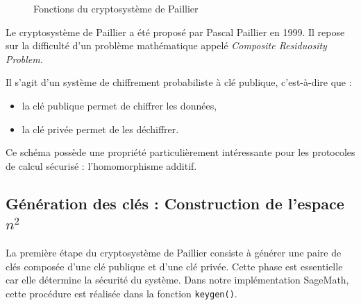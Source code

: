 \documentclass[12pt,a4paper]{report}
\begin{document}
\begin{figure}[h]
    \caption{ Fonctions du cryptosystème de Paillier}
\end{figure}


Le cryptosystème de Paillier a été proposé par Pascal Paillier en 1999.  
Il repose sur la difficulté d’un problème mathématique appelé \textit{Composite Residuosity Problem}.

Il s’agit d’un système de chiffrement probabiliste à clé publique, c’est-à-dire que :
\begin{itemize}
\item la clé publique permet de chiffrer les données,
\item la clé privée permet de les déchiffrer.
\end{itemize}

Ce schéma possède une propriété particulièrement intéressante pour les protocoles de calcul sécurisé : l’homomorphisme additif.



\subsection{Génération des clés : Construction de l'espace $n^2$}


La première étape du cryptosystème de Paillier consiste à générer une paire de
clés composée d'une clé publique et d'une clé privée.  
Cette phase est essentielle car elle détermine la sécurité du système.  
Dans notre implémentation SageMath, cette procédure est réalisée dans la
fonction \texttt{keygen()}.
\end{document}
